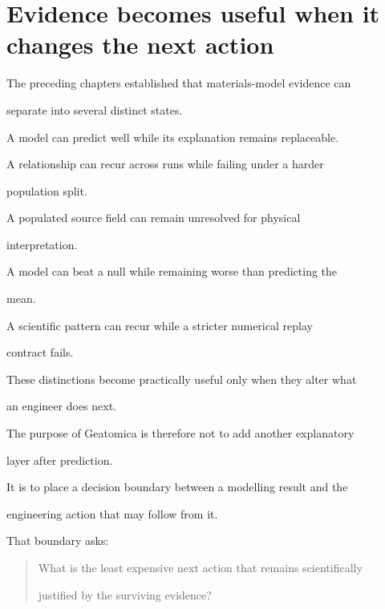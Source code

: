 \documentclass[11pt,a4paper,oneside]{report}
\begin{document}
\label{chap:engineering-decisions}





\section{Evidence becomes useful when it changes the next action}



The preceding chapters established that materials-model evidence can

separate into several distinct states.



A model can predict well while its explanation remains replaceable.



A relationship can recur across runs while failing under a harder

population split.



A populated source field can remain unresolved for physical

interpretation.



A model can beat a null while remaining worse than predicting the

mean.



A scientific pattern can recur while a stricter numerical replay

contract fails.



These distinctions become practically useful only when they alter what

an engineer does next.



The purpose of Geatomica is therefore not to add another explanatory

layer after prediction.



It is to place a decision boundary between a modelling result and the

engineering action that may follow from it.



That boundary asks:



\begin{quote}



What is the least expensive next action that remains scientifically

justified by the surviving evidence?



\end{quote}
\end{document}
